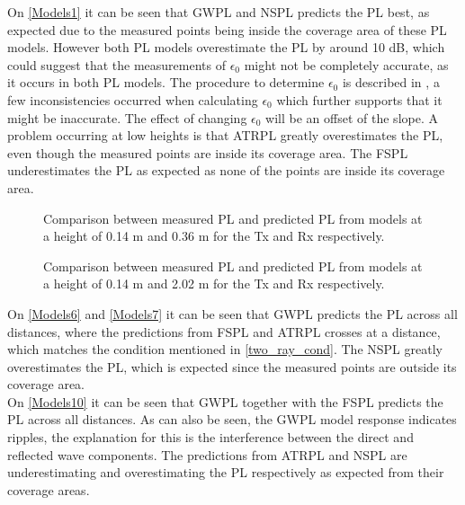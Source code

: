 


On \autoref{Models1} it can be seen that GWPL and NSPL predicts the PL best, as expected due to the measured points being inside the coverage area of these PL models. However both PL models overestimate the PL by around 10 dB, which could suggest that the measurements of $\epsilon_0$ might not be completely accurate, as it occurs in both PL models. The procedure to determine $\epsilon_0$ is described in \cite{Kim}, a few inconsistencies occurred when calculating $\epsilon_0$ which further supports that it might be inaccurate. The effect of changing $\epsilon_0$ will be an offset of the slope. A problem occurring at low heights is that ATRPL greatly overestimates the PL, even though the measured points are inside its coverage area. The FSPL underestimates the PL as expected as none of the points are inside its coverage area.


\begin{figure}[H]
\centering

\caption{Comparison between measured PL and predicted PL from models at a height of 0.14 m and 0.36 m for the Tx and Rx respectively.}
\label{Models6}
\end{figure}


\begin{figure}[!htbp]
\centering

\caption{Comparison between measured PL and predicted PL from models at a height of 0.14 m and 2.02 m for the Tx and Rx respectively.}
\label{Models7}
\end{figure}

\vspace{-0.3em}
On \autoref{Models6} and \autoref{Models7} it can be seen that GWPL predicts the PL across all distances, where the predictions from FSPL and ATRPL crosses at a distance, which matches the condition mentioned in \eqref{two_ray_cond}. The NSPL greatly overestimates the PL, which is expected since the measured points are outside its coverage area.\\

On \autoref{Models10} it can be seen that GWPL together with the FSPL predicts the PL across all distances. As can also be seen, the GWPL model response indicates ripples, the explanation for this is the interference between the direct and reflected wave components. The predictions from ATRPL and NSPL are underestimating and overestimating the PL respectively as expected from their coverage areas.

